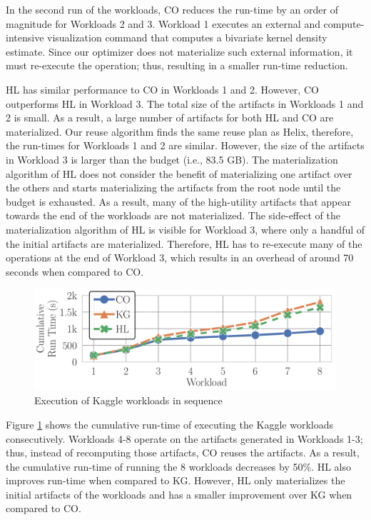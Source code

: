 In the second run of the workloads, CO reduces the run-time by an order of magnitude for Workloads 2 and 3.
Workload 1 executes an external and compute-intensive visualization command that computes a bivariate kernel density estimate.
Since our optimizer does not materialize such external information, it must re-execute the operation; thus, resulting in a smaller run-time reduction.

HL has similar performance to CO in Workloads 1 and 2.
However, CO outperforms HL in Workload 3. 
The total size of the artifacts in Workloads 1 and 2 is small.
As a result, a large number of artifacts for both HL and CO are materialized.
Our reuse algorithm finds the same reuse plan as Helix, therefore, the run-times for Workloads 1 and 2 are similar.
However, the size of the artifacts in Workload 3 is larger than the budget (i.e., 83.5 GB).
The materialization algorithm of HL does not consider the benefit of materializing one artifact over the others and starts materializing the artifacts from the root node until the budget is exhausted.
As a result, many of the high-utility artifacts that appear towards the end of the workloads are not materialized.
The side-effect of the materialization algorithm of HL is visible for Workload 3, where only a handful of the initial artifacts are materialized.
Therefore, HL has to re-execute many of the operations at the end of Workload 3, which results in an overhead of around 70 seconds when compared to CO.
\begin{figure}[t]
\centering
\includegraphics[width=1.0\columnwidth]{images/experiment-results/kaggle_home_credit/execution_time/different_workloads}
\caption{Execution of Kaggle workloads in sequence}
\label{exp-execution-different-kaggle-workload}
\vspace{-4mm}
\end{figure}

Figure \ref{exp-execution-different-kaggle-workload} shows the cumulative run-time of executing the Kaggle workloads consecutively.
Workloads 4-8 operate on the artifacts generated in Workloads 1-3; thus, instead of recomputing those artifacts, CO reuses the artifacts.
As a result, the cumulative run-time of running the 8 workloads decreases by 50\%.
HL also improves run-time when compared to KG. 
However, HL only materializes the initial artifacts of the workloads and has a smaller improvement over KG when compared to CO.

